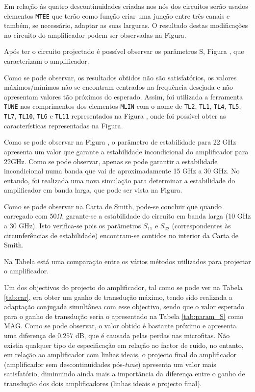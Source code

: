 \documentclass[11pt]{article}
\numberwithin{equation}{section}
\begin{document}
Em relação às quatro descontinuidades criadas nos nós dos circuitos serão usados elementos \texttt{MTEE} que terão como função criar uma junção entre três canais e também, se necessário, adaptar as suas larguras. O resultado destas modificações no circuito do amplificador podem ser observadas na Figura.

Após ter o circuito projectado é possível observar os parâmetros S, Figura , que caracterizam o amplificador.


Como se pode observar, os resultados obtidos não são satisfatórios, os valores máximos/mínimos não se encontram centrados na frequência desejada e não apresentam valores tão próximos do esperado. Assim, foi utilizada a ferramenta \texttt{TUNE} nos comprimentos dos elementos \texttt{MLIN} com o nome de \texttt{TL2}, \texttt{TL1}, \texttt{TL4}, \texttt{TL5}, \texttt{TL7}, \texttt{TL10}, \texttt{TL6} e \texttt{TL11} representados na Figura , onde foi possível obter as características representadas na Figura.


Como se pode observar na Figura , o parâmetro de estabilidade para 22 GHz apresenta um valor que garante a estabilidade incondicional do amplificador para 22GHz. Como se pode observar, apenas se pode garantir a estabilidade incondicional numa banda que vai de aproximadamente 15 GHz a 30 GHz. No entando, foi realizada uma nova simulação para determinar a estabilidade do amplificador em banda larga, que pode ser vista na Figura. 

Como se pode observar na Carta de Smith, pode-se concluir que quando carregado com 50$\Omega$, garante-se a estabilidade do circuito em banda larga (10 GHz a 30 GHz). Isto verifica-se pois os parâmetros $S_{11}$ e $S_{22}$ (correspondentes às circunferências de estabilidade) encontram-se contidos no interior da Carta de Smith.


Na Tabela  está uma comparação entre os vários métodos utilizados para projectar o amplificador.


Um dos objectivos do projecto do amplificador, tal como se pode ver na Tabela \ref{tab:car}, era obter um ganho de transdução máximo, tendo sido realizada a adaptação conjugada simultânea com esse objectivo, sendo que o valor esperado para o ganho de transdução seria o apresentado na Tabela \ref{tab:param_S} como MAG. Como se pode observar, o valor obtido é bastante próximo e apresenta uma diferença de $0.257$ dB, que é causada pelas perdas nas microfitas. Não existia qualquer tipo de especificação em relação ao factor de ruído, no entanto, em relação ao amplificador com linhas ideais, o projecto final do amplificador (amplificador sem descontinuidades pós-\textit{tune}) apresenta um valor mais satisfatório, diminuindo ainda mais a importância da diferença entre o ganho de transdução dos dois amplificadores (linhas ideais e projecto final).
\end{document}
